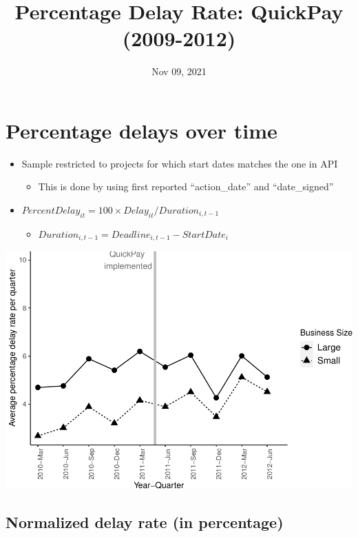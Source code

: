 \documentclass[
]{article}
\title{Percentage Delay Rate: QuickPay (2009-2012)}
\author{}
\date{\vspace{-2.5em}Nov 09, 2021}
\providecommand{\tightlist}{%
  \setlength{\itemsep}{0pt}\setlength{\parskip}{0pt}}
\begin{document}
\maketitle

\hypertarget{percentage-delays-over-time}{%
\section{Percentage delays over
time}\label{percentage-delays-over-time}}

\begin{itemize}
\tightlist
\item
  Sample restricted to projects for which start dates matches the one in
  API

  \begin{itemize}
  \tightlist
  \item
    This is done by using first reported ``action\_date'' and
    ``date\_signed''
  \end{itemize}
\item
  \(PercentDelay_{it}=100 \times Delay_{it}/Duration_{i,t-1}\)

  \begin{itemize}
  \tightlist
  \item
    \(Duration_{i,t-1} = Deadline_{i,t-1} - StartDate_i\)
  \end{itemize}
\end{itemize}

\includegraphics{qp_first_pc_delay_files/figure-latex/plot_pc_delay-1.pdf}

\hypertarget{normalized-delay-rate-in-percentage}{%
\subsection{Normalized delay rate (in
percentage)}\label{normalized-delay-rate-in-percentage}}
\end{document}
